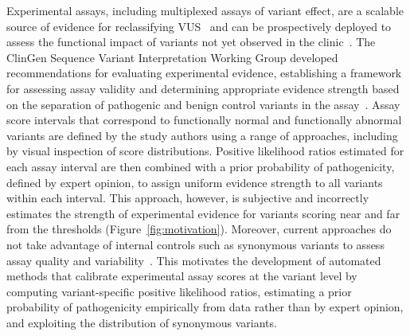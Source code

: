 \documentclass[11pt]{article}
\theoremstyle{plain}
\begin{document}
Experimental assays, including multiplexed assays of variant effect, are a scalable source of evidence for reclassifying VUS~\cite{variant_starita_2017, FowlerRehm2024} and can be prospectively deployed to assess the functional impact of variants not yet observed in the clinic~\cite{Tabet2022, Fowler2023, mcewen2026multiplexed}. The ClinGen Sequence Variant Interpretation Working Group developed recommendations for evaluating experimental evidence, establishing a framework for assessing assay validity and determining appropriate evidence strength based on the separation of pathogenic and benign control variants in the assay~\cite{brnich2020recommendations}. %
Assay score intervals that correspond to functionally normal and functionally abnormal variants are defined by the study authors using a range of approaches, including by visual inspection of score distributions. 
Positive likelihood ratios estimated for each assay interval are then combined with a prior probability of pathogenicity, defined by expert opinion, to assign uniform evidence strength to all variants within %
each 
interval. This approach, however, is subjective and  %
incorrectly estimates the strength of experimental evidence for variants scoring near and far from the thresholds (Figure~\ref{fig:motivation}). 
Moreover, current approaches %
do not take advantage of internal controls such as synonymous variants to assess assay quality and variability~\cite{Gelman2019}. This motivates the development of automated methods that calibrate experimental assay scores at the variant level by computing variant-specific positive likelihood ratios, estimating a prior probability of pathogenicity empirically from data rather than by expert opinion, and exploiting the distribution of synonymous variants. %
\end{document}

